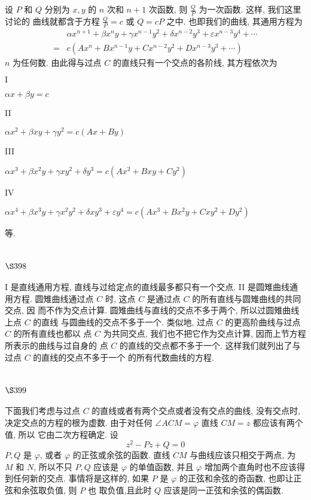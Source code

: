 设 $P$ 和 $Q$ 分别为 $x, y$ 的 $n$ 次和 $n+1$ 次函数, 则 $\frac{Q}{P}$ 为一次函数. 这样, 我们这里讨论的 曲线就都含于方程 $\frac{Q}{P}=c$ 或 $Q=c P$ 之中. 也即我们的曲线, 其通用方程为
\[
\begin{aligned}
& \alpha x^{n+1}+\beta x^{n} y+\gamma x^{n-1} y^{2}+\delta x^{n-2} y^{3}+\varepsilon x^{n-3} y^{4}+\cdots \\
= & c\left(A x^{n}+B x^{n-1} y+C x^{n-2} y^{2}+D x^{n-3} y^{3}+\cdots\right)
\end{aligned}
\]
$n$ 为任何数. 由此得与过点 $C$ 的直线只有一个交点的各阶线, 其方程依次为

$\mathrm{I}$

$\alpha x+\beta y=c$

II

$\alpha x^{2}+\beta x y+\gamma y^{2}=c(A x+B y)$

III

$\alpha x^{3}+\beta x^{2} y+\gamma x y^{2}+\delta y^{3}=c\left(A x^{2}+B x y+C y^{2}\right)$

IV

$\alpha x^{4}+\beta x^{3} y+\gamma x^{2} y^{2}+\delta x y^{3}+\varepsilon y^{4}=c\left(A x^{3}+B x^{2} y+C x y^{2}+D y^{2}\right)$

等.

\section{$\S 398$}

I 是直线通用方程, 直线与过给定点的直线最多都只有一个交点. II 是圆雉曲线通 用方程. 圆雉曲线通过点 $C$ 时, 这点 $C$ 是通过点 $C$ 的所有直线与圆雉曲线的共同交点, 因 而不作为交点计算. 圆雉曲线与直线的交点不多于两个, 所以过圆雉曲线上点 $C$ 的直线 与圆曲线的交点不多于一个. 类似地, 过点 $C$ 的更高阶曲线与过点 $C$ 的所有直线也都以 点 $C$ 为共同交点, 我们也不把它作为交点计算, 因而上节方程所表示的曲线与过自身的 点 $C$ 的直线的交点都不多于一个. 这样我们就列出了与过点 $C$ 的直线的交点不多于一个 的所有代数曲线的方程.

\section{$\S 399$}

下面我们考虑与过点 $C$ 的直线或者有两个交点或者没有交点的曲线, 没有交点时, 决定交点的方程的根为虚数. 由于对任何 $\angle A C M=\varphi$ 直线 $C M=z$ 都应该有两个值, 所以 它由二次方程确定. 设
\[
z^{2}-P z+Q=0
\]
$P, Q$ 是 $\varphi$, 或者 $\varphi$ 的正弦或余弦的函数. 直线 $C M$ 与曲线应该只相交于两点, 为 $M$ 和 $N$, 所以不只 $P, Q$ 应该是 $\varphi$ 的单值函数, 并且 $\varphi$ 增加两个直角时也不应该得到任何新的交点. 事情将是这样的, 如果 $P$ 是 $\varphi$ 的正弦和余弦的奇函数, 也即让正弦和余弦取负值, 则 $P$ 也 取负值,且此时 $Q$ 应该是同一正弦和余弦的偶函数.

